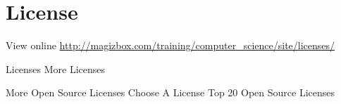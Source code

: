 \chapter{License}

View online \href{http://magizbox.com/training/computer_science/site/licenses/}{http://magizbox.com/training/computer_science/site/licenses/}

Licenses
More
Licenses


More
Open Source Licenses
Choose A License
Top 20 Open Source Licenses